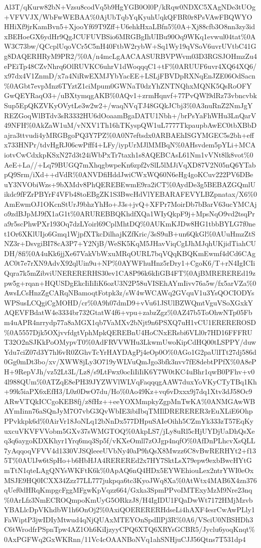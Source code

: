 \documentclass[]{article}
\begin{document}
Al3T/qKurw82bN+Vzsu8codVq5b9HgYGB0Ol0P/kRqw0NDXC5XAgNDe3tUOg+VFVVJX/WbFwWEBAA\%0AjUbTqbYqKyuhUqkQFBR0r8PsVAwFBQWYOHHiXf9jrKamBvn5+XjooYf69T9Zff+U6ehkHxaLBfn5\%0A+Xj88cfb3O8nn3zy3idxBEHoeGX6ydHr9QgJCUFUVBSio6MRGBgIhUIBu90Oq9WKq1evwul04tat\%0AW3C73bw/QCcplUqoVCr5C5nH40FtbW2rybW+Sq1Wy19qVSoV6uvrUVtbC41Gg8DAQERHRyM9PR2/\%0A/n4mcLgAACAASURBVPWvm03D3RGSJOHmzZu4ePEiTp48CZvNhrq6OlRUVKC6uhrV1dWoqqqC1+tF\%0ARUUF6uvr4XQ64XQ6/x97dx4V1ZnmD/x7a4NiRwEXMJYbYacEE+LSLjFBVDpRXNqEnJZE06OdSacn\%0AGbt7evpMnz6TYztZ1ciMpum0GWNaT0dzYhZNTNQhxMQNK5QsRoOFYGwQEYRaqO3+/uBXtymqgAKB\%0AQv1+zrmHqnvf+77PvQWl9dRz73vbncvbkSup5EpQKZVKyOVytLe3w2w2+/waqNVqTJ48GQkJCbj3\%0A3nuRnZ2NmJgYREZGoqWlBTdv3sR3332HU6dOoaamBgaDATU1Nbh+/brPsYaFhWHu3LnQarV49NFH\%0AkZaW1uM/vNXV1Th16hTKyspQW1uL7777TkpaupbAwEC0tbXBbDajra3ttvudi4yMRGBgoPQ3Y7PZ\%0A0N7eftsdx0ARBAEhISGYMGEC5s2bh+effx733HNPr/tdvHgRJ06cwPfff4+LFy/iypUrMJlMMBqN\%0AHsvdem5pYLi+MCAiotvCwCdxkpKSxN27d3t24iWbPxTr7taxh1s8AQEBCAsL61Nm1vVNt8lk8vot\%0AeE+La//+Lq79BUGQ7mXhqgbwpeKn6zpf2vSlL5lMJiVqXD87V2N05nQ6YTabpQ9Srm/iXd++dVdR\%0ANVDfiHddJwiCWxWQ60N6eHg4goKCuv222PV6DBeuY3NVObiWzs+9bXMdv8PhQEREBEwmE9ra2iCT\%0AydDe3g5BEBAZGQmlUikdc9fFZrPBYrF4VFb48toEBgZK1S3BwcHdVlYEBARAFEVYLBZpnatax/X6\%0AmEwmOJ1OKcnStUrJ9bhzYhHo+J3s+jvQ+XFPr7MoirDb7bBarV63ucYMCAjo9zdBJpMJ9fX1aG1t\%0ARUREBBQKhdfXQa1WIyQkpF9j+MpsNqO9vd2tsqPra9r5scPhwPXr193Oq7dzLYoirl69CplMhtDQ\%0AUKmKJDw8HG1tbbBYLG7f0net1Or6XKlUIjo6Gmq1WjpfXTkcDilhajKZfKric/3sS9uB+un6QkGl\%0AUuHmzZtSNZ3r+DsvgiBI78cA3P7+Y2NjB/WeSK5KqM5JHavViqCgIJhMJqhUKjidTiahCUDH/8fi\%0A4uKk6jjXe67VakVbWxuMRqOURL7bqVQqKBQKmEwmf4dCd6CAgAC0t7e7rXN9AdvX92qlUin9u+NP\%0AYWFhuHnz5rDry1+CgoK6/T+rN4IgICIiQqra7k5mZibviUNERERERHS30ev1CA8P96k6kIiGB4FT\%0AjBMREREREd19zpw5g+rqan+HQUSDgEkcIiIiIiK6ozU3N2P58uVISEhAYmIivv76a5w/fx5arVZa\%0AwsLCsHnzZgCARqNBamoqtFotpk3z/sW4wWCAWq2GVquV1u3YsQOCIODYsWPSusLCQgiCgMOHD/cr\%0A9h07dmD9+vVu61JSUlBZWQmtVguVSoXGxkYAQEVFBdatW4e3334br732GtatW4f6+vpu+zabzZgz\%0AZ47b5ToOhwNTp05Fbm4uAPR4nrrydp77a8aMGX1qb7VaMXv2bNjt9n6PSXQ7uH1vCU1EREREROSD\%0A5557Djk5OXjvvfdgtVphMpkQEREBnU4HoCNxERsbi6VLl0r7HD16FFFRUT32O2nSJKkPoOMypvT0\%0AdFRVVWHu3LkwmUwoKipCdHQ00tLSPPY/duwYdu7ciZ07d3Y7hl6vR0ZGhvTcYrHAYDAgPj4eOp0O\%0AGo1G2paUlITt27dj586d0Gg0mDt3bo/xv/XWW8jLy3O719yWLVuQmJgo3bfk3nvv7fE8debtPPfX\%0A8ePH+9RepVJh/vz52Lt3L/Lz8/s9LtFwx0ocIiIiIiK6Y7W0tKC4uBhr1qwB0PFhv+v04l988QUm\%0ATZqE8ePH39JYZWVlWLVqFaqqqgAAW7duxYoVKyCTyTBq1Kh+99k5iaPX6xEfH3/L0z0DwO7du/Ho\%0Ao49Kz+vq6vDxxx9j7dq1Xtv3dJ58Oc9ARwVTQkICCgoKEB8fj/z8fHz++eeYOXMmpkyZgpMnTwKA\%0ANMGAwWBAYmIinn76aSQnJyM7O7vbG3QvWbIE3ibiIbqTMIlDRERERER3rEuXLiE6OhpPPvkkpk6d\%0AirVr18JoNLq12bNnDx577DHpuSAIeOihh5CZmYk333zT57EqKyuxcuVKVFVVobm5GXv37sWMGTOQ\%0AkpLS7/jLy8uRl5cHjUYDjUaDhQsXeq3q6aygoKDXKhyr1Yrq6mq3Sp5f/vKXeOmll7zOJgp4nqfO\%0AfDnPLhcvXsQLL7yAqqoqVFVV4d1330VJSQleeeUVbNy40aP9hQsX8Mwzz6C8vBwRERHYt2+f135T\%0AUlJw6tSpHo+b6HbHJA4REREREd2x7HY7SktLsX79epw9exbBwcHYtGmTtN1qteLAgQNYsWKFtK6k\%0ApAQ6nQ4HDx5EYWEhiouLex2ntrYWI0eOxMSJE9HQ0ICXX34Zzz77LL777jukpqa6tc3KyoJWq8Xa\%0AtWtx4MAB6X4zn376qUef0dHRqKmpgcFggMFgwKpVqzz664/Gxka3SpmPPvoIMTExyMzM9Nre23nq\%0ArLfz3NmECROQmpoKmUyG5ORkzJ8/H4IgIDU1FQaDwWt7172HMjMzvbYBALlcDpVKhdbW1h6OnOj2\%0AxiQOERERERHdseLi4hAXF4esrCwAwPLly1FaWiptP3jwIDIyMtwud4qNjQUAxMTEYOnSpdIlPj3R\%0A6/VSciU0NBSHDh3C6tWrodfrPSpnTpw4AZ1Oh6KiIjzyyCPQ6XTQ6XRYsGCBR5/Jyclu6yoqKnqt\%0AxPGFWq2GxWKRnn/11Vc4cOAANBoNVq1ahSNHjuCJJ56Qtns7T531dp4
\end{document}
